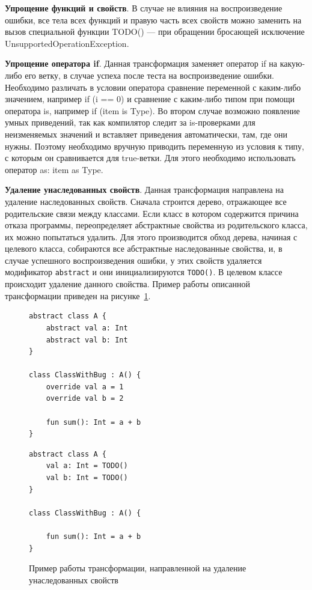 \textbf{Упрощение функций и свойств}. В случае не влияния на воспроизведение ошибки, все тела всех функций и правую часть всех свойств можно заменить на вызов специальной функции TODO() --- при обращении бросающей исключение UnsupportedOperationException.

\textbf{Упрощение оператора if}. Данная трансформация заменяет оператор if на какую-либо его ветку, в случае успеха после теста на воспроизведение ошибки. Необходимо различать в условии оператора сравнение переменной с каким-либо значением, например if (i == 0) и сравнение с каким-либо типом при помощи оператора is, например if (item is Type). Во втором случае возможно появление умных приведений, так как компилятор следит за is-проверками для неизменяемых значений и вставляет приведения автоматически, там, где они нужны. Поэтому необходимо вручную приводить переменную из условия к типу, с которым он сравнивается для true-ветки. Для этого необходимо использовать оператор as: item as Type.

\textbf{Удаление унаследованных свойств}. Данная трансформация направлена на удаление наследованных свойств. Сначала строится дерево, отражающее все родительские связи между классами. Если класс в котором содержится причина отказа программы, переопределяет абстрактные свойства из родительского класса, их можно попытаться удалить. Для этого производится обход дерева, начиная с целевого класса, собираются все абстрактные наследованные свойства, и, в случае успешного воспроизведения ошибки, у этих свойств удаляется модификатор \texttt{abstract} и они инициализируются \texttt{TODO()}. В целевом классе происходит удаление данного свойства. Пример работы описанной трансформации приведен на рисунке~\ref{ex:prop}. 
\begin{figure}
\begin{lstlisting}
abstract class A {
    abstract val a: Int
    abstract val b: Int
}

class ClassWithBug : A() {
    override val a = 1
    override val b = 2
    
    fun sum(): Int = a + b
}
\end{lstlisting}
\begin{lstlisting}
abstract class A {
    val a: Int = TODO()
    val b: Int = TODO()
}

class ClassWithBug : A() {

    fun sum(): Int = a + b
}
\end{lstlisting}
\caption{\label{ex:prop}Пример работы трансформации, направленной на удаление унаследованных свойств}
\end{figure}

